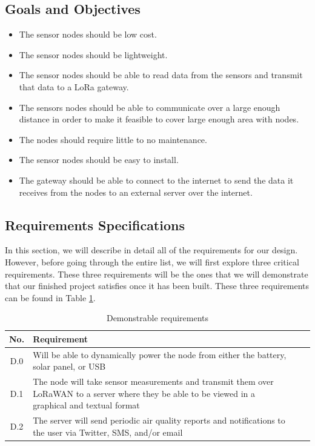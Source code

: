 \subsection{Goals and Objectives}
\begin{itemize}
    \item The sensor nodes should be low cost.
    \item The sensor nodes should be lightweight.
    \item The sensor nodes should be able to read data from the sensors and transmit that data to a LoRa gateway.
    \item The sensors nodes should be able to communicate over a large enough distance in order to make it feasible to cover large enough area with nodes.
    \item The nodes should require little to no maintenance.
    \item The sensor nodes should be easy to install.
    \item The gateway should be able to connect to the internet to send the data it receives from the nodes to an external server over the internet.
\end{itemize}


\subsection{Requirements Specifications}
In this section, we will describe in detail all of the requirements for our design. However, before going through the entire list, we will first explore three critical requirements. These three requirements will be the ones that we will demonstrate that our finished project satisfies once it has been built. These three requirements can be found in Table \ref{tab:demon-requirements}.
\begin{table}[H]
\centering
\caption{Demonstrable requirements}
\begin{tabularx}{\linewidth}{|c|X|c|c|}
\hline
No. & Requirement \\
\hline\hline
D.0 & Will be able to dynamically power the node from either the battery, solar
panel, or USB \\\hline
D.1 & The node will take sensor measurements and transmit them over LoRaWAN to a
server where they be able to be viewed in a graphical and textual format
\\\hline
D.2 & The server will send periodic air quality reports and notifications to the
user via Twitter, SMS, and/or email \\\hline

\end{tabularx}
\label{tab:demon-requirements}
\end{table}

